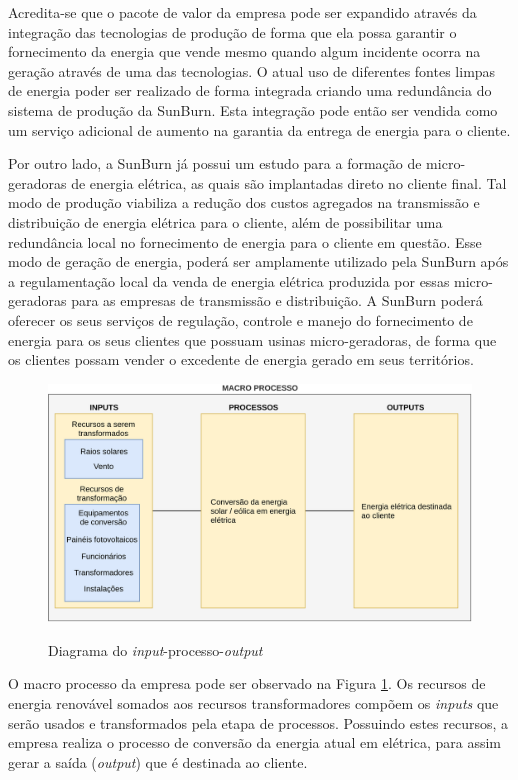 Acredita-se que o pacote de valor da empresa pode ser expandido através da integração das tecnologias de produção de forma que ela possa garantir o fornecimento da energia que vende mesmo quando algum incidente ocorra na geração através de uma das tecnologias. O atual uso de diferentes fontes limpas de energia poder ser realizado de forma integrada criando uma redundância do sistema de produção da SunBurn. Esta integração pode então ser vendida como um serviço adicional de aumento na garantia da entrega de energia para o cliente.

Por outro lado, a SunBurn já possui um estudo para a formação de micro-geradoras de energia elétrica, as quais são implantadas direto no cliente final. Tal modo de produção viabiliza a redução dos custos agregados na transmissão e distribuição de energia elétrica para o cliente, além de possibilitar uma redundância local no fornecimento de energia para o cliente em questão. Esse modo de geração de energia, poderá ser amplamente utilizado pela SunBurn após a regulamentação local da venda de energia elétrica produzida por essas micro-geradoras para as empresas de transmissão e distribuição. A SunBurn poderá oferecer os seus serviços de regulação, controle e manejo do fornecimento de energia para os seus clientes que possuam usinas micro-geradoras, de forma que os clientes possam vender o excedente de energia gerado em seus territórios.

\begin{figure}[H]
    \caption{Diagrama do \textit{input}-processo-\textit{output}}
    \includegraphics[width = 1\textwidth]{images/diagram.png}
    \label{fig:gestao_operacoes_aplicacao_diagrama}
\end{figure}

O macro processo da empresa pode ser observado na Figura \ref{fig:gestao_operacoes_aplicacao_diagrama}. Os recursos de energia renovável somados aos recursos transformadores compõem os \textit{inputs} que serão usados e transformados pela etapa de processos. Possuindo estes recursos, a empresa realiza o processo de conversão da energia atual em elétrica, para assim gerar a saída (\textit{output}) que é destinada ao cliente.


